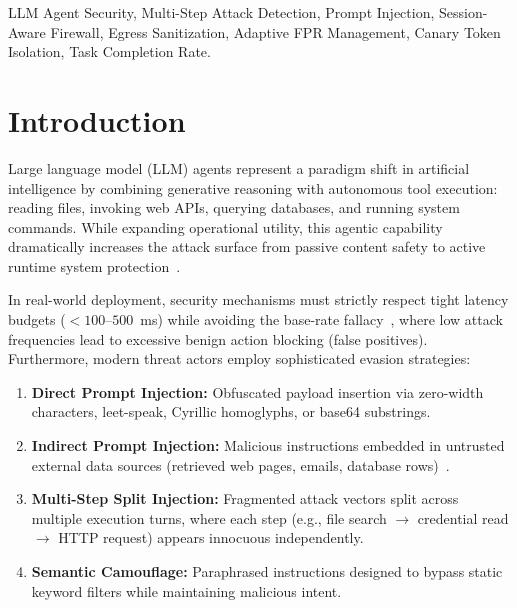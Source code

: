 \documentclass[conference]{IEEEtran}
\begin{document}
\begin{IEEEkeywords}
LLM Agent Security, Multi-Step Attack Detection, Prompt Injection, Session-Aware Firewall, Egress Sanitization, Adaptive FPR Management, Canary Token Isolation, Task Completion Rate.
\end{IEEEkeywords}

\section{Introduction}
Large language model (LLM) agents represent a paradigm shift in artificial intelligence by combining generative reasoning with autonomous tool execution: reading files, invoking web APIs, querying databases, and running system commands. While expanding operational utility, this agentic capability dramatically increases the attack surface from passive content safety to active runtime system protection~\cite{owasp2023, nist2023}.

In real-world deployment, security mechanisms must strictly respect tight latency budgets ($<100$–$500$~ms) while avoiding the base-rate fallacy~\cite{axelsson2000base}, where low attack frequencies lead to excessive benign action blocking (false positives). Furthermore, modern threat actors employ sophisticated evasion strategies:
\begin{enumerate}
    \item \textbf{Direct Prompt Injection:} Obfuscated payload insertion via zero-width characters, leet-speak, Cyrillic homoglyphs, or base64 substrings.
    \item \textbf{Indirect Prompt Injection:} Malicious instructions embedded in untrusted external data sources (retrieved web pages, emails, database rows)~\cite{greshake2023not}.
    \item \textbf{Multi-Step Split Injection:} Fragmented attack vectors split across multiple execution turns, where each step (e.g., file search $\rightarrow$ credential read $\rightarrow$ HTTP request) appears innocuous independently.
    \item \textbf{Semantic Camouflage:} Paraphrased instructions designed to bypass static keyword filters while maintaining malicious intent.
\end{enumerate}
\end{document}
